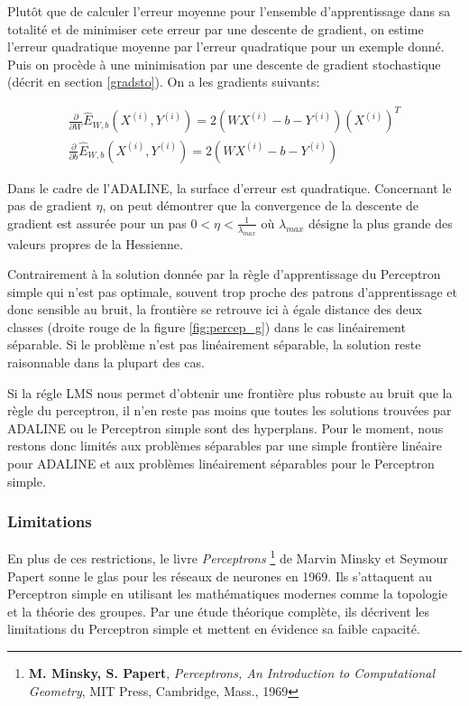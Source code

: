 Plutôt que de calculer l'erreur moyenne pour l'ensemble d'apprentissage dans sa
totalité et de minimiser cete erreur par une descente de gradient, on estime
l'erreur quadratique moyenne par l'erreur quadratique pour un exemple donné.
Puis on procède à une minimisation par une descente de gradient stochastique
(décrit en section \ref{gradsto}). On a les gradients suivants:

\begin{eqnarray}
\frac{\partial}{\partial W}\hat{E}_{W,b}(X^{(i)},Y^{(i)}) = 2(WX^{(i)}-b-Y^{(i)})(X^{(i)})^{T}\\
\frac{\partial}{\partial b}\hat{E}_{W,b}(X^{(i)},Y^{(i)})  = 2(WX^{(i)}-b-Y^{(i)})
\end{eqnarray}

Dans le cadre de l'ADALINE, la surface d'erreur est quadratique. Concernant le
pas de gradient $\eta$, on peut démontrer que la convergence de la descente de
gradient est assurée pour un pas $0<\eta<\frac{1}{\lambda_{max}}$ où
$\lambda_{max}$ désigne la plus grande des valeurs propres de la Hessienne.

Contrairement à la solution donnée par la règle d'apprentissage du Perceptron
simple qui n'est pas optimale, souvent trop proche des patrons d'apprentissage
et donc sensible au bruit, la frontière se retrouve ici à égale distance des
deux classes (droite rouge de la figure \ref{fig:percep_g}) dans le cas
linéairement séparable. Si le problème n'est pas linéairement séparable, la
solution reste raisonnable dans la plupart des cas.

Si la régle LMS nous permet d'obtenir une frontière plus robuste au bruit que
la règle du perceptron, il n'en reste pas moins que toutes les solutions
trouvées par ADALINE ou le Perceptron simple sont des hyperplans. Pour le
moment, nous restons donc limités aux problèmes séparables par une simple
frontière linéaire pour ADALINE et aux problèmes linéairement séparables pour
le Perceptron simple.

\subsubsection{Limitations}

En plus de ces restrictions, le livre \textit{Perceptrons}
\cite{minsky}\footnote{\textbf{M. Minsky, S. Papert}, \textit{Perceptrons, An
Introduction to Computational Geometry}, MIT Press, Cambridge, Mass., 1969} de
Marvin Minsky et Seymour Papert sonne le glas pour les réseaux de neurones en
1969. Ils s'attaquent au Perceptron simple en utilisant les mathématiques
modernes comme la topologie et la théorie des groupes. Par une étude théorique
complète, ils décrivent les limitations du Perceptron simple et mettent en
évidence sa faible capacité.


